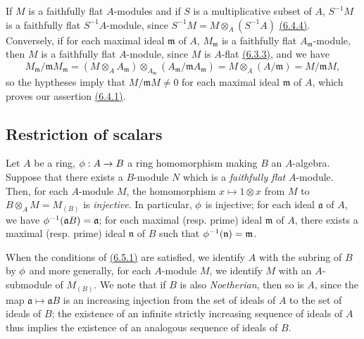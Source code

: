 \begin{env}[6.4.5]
\label{env-0.6.4.5}
If $M$ is a faithfully flat $A$-modules and if $S$ is a multiplicative subset of $A$,
$S^{-1}M$ is a faithfully flat $S^{-1}A$-module, since $S^{-1}M=M\otimes_A(S^{-1}A)$
\hyperref[env-0.6.4.4]{(6.4.4)}. Conversely, if for each maximal ideal $\mathfrak{m}$ of $A$,
$M_\mathfrak{m}$ is a faithfully flat $A_\mathfrak{m}$-module, then $M$ is a faithfully flat
$A$-module, since $M$ is $A$-flat \hyperref[env-0.6.3.3]{(6.3.3)}, and we have
\[
  M_\mathfrak{m}/\mathfrak{m}M_\mathfrak{m}
  =(M\otimes_A A_\mathfrak{m})
  \otimes_{A_\mathfrak{m}}(A_\mathfrak{m}/\mathfrak{m}A_\mathfrak{m})
  =M\otimes_A(A/\mathfrak{m})=M/\mathfrak{m}M,
\]
so the hyptheses imply that $M/\mathfrak{m}M\neq 0$ for each maximal ideal $\mathfrak{m}$ of
$A$, which proves our assertion \hyperref[env-0.6.4.1]{(6.4.1)}.
\end{env}

\subsection{Restriction of scalars}
\label{subsection-restriction-of-scalars}

\begin{env}[6.5.1]
\label{env-0.6.5.1}
Let $A$ be a ring, $\phi:A\to B$ a ring homomorphism making $B$ an $A$-algebra. Suppose that
there exists a $B$-module $N$ which is a {\em faithfully flat} $A$-module. Then, for each
$A$-module $M$, the homomorphism $x\mapsto 1\otimes x$ from $M$ to $B\otimes_A M=M_{(B)}$ is
{\em injective}. In particular, $\phi$ is injective; for each ideal $\mathfrak{a}$ of $A$,
we have $\phi^{-1}(\mathfrak{a}B)=\mathfrak{a}$; for each maximal (resp. prime) ideal
$\mathfrak{m}$ of $A$, there exists a maximal (resp. prime) ideal $\mathfrak{n}$ of $B$ such
that $\phi^{-1}(\mathfrak{n})=\mathfrak{m}$.
\end{env}

\begin{env}[6.5.2]
\label{env-0.6.5.2}
When the conditions of \hyperref[env-0.6.5.1]{(6.5.1)} are satisfied, we identify $A$ with the subring of
$B$ by $\phi$ and more generally, for each $A$-module $M$, we identify $M$ with an
$A$-submodule of $M_{(B)}$. We note that if $B$ is also {\em Noetherian}, then so is $A$,
since the map $\mathfrak{a}\mapsto\mathfrak{a}B$ is an increasing injection from the set of
ideals of $A$ to the set of ideals of $B$; the existence of an infinite strictly increasing
sequence of ideals of $A$ thus implies the existence of an analogous sequence of ideals of
$B$.
\end{env}

